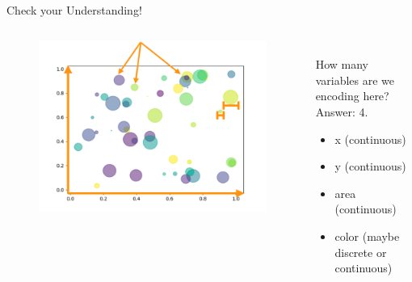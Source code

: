 \documentclass[aspectratio=169]{../latex_main/tntbeamer}  %
\begin{document}
	\begin{frame}{Check your Understanding!}
	    \begin{columns}
	        \begin{column}{.5\textwidth}
	              \begin{figure}
	                  \includegraphics[width=1.0\textwidth]{Bild16}
	               \end{figure} 
	        \end{column}
	        
	        \begin{column}{.5\textwidth}
	              \bigskip
	              \bigskip
	              \\How many variables are we encoding here?\\
	              Answer: 4.
	              \begin{itemize}
	                  \item x (continuous)
	                  \item y (continuous)
	                  \item area (continuous)
	                  \item color (maybe discrete or continuous)
	              \end{itemize}
	        \end{column}
	        
	    \end{columns}
	\end{frame}
	
	
	
\end{document}
